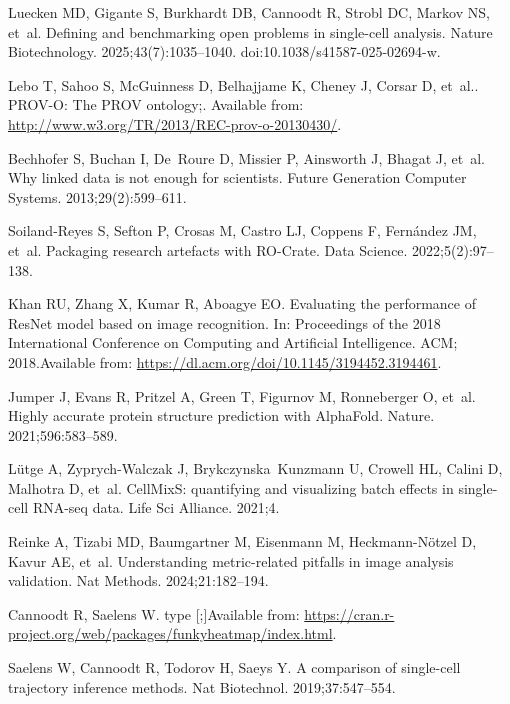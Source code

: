\documentclass[11pt]{article}
\begin{document}
\begin{thebibliography}{10}
Luecken MD, Gigante S, Burkhardt DB, Cannoodt R, Strobl DC, Markov NS, et~al.
\newblock Defining and benchmarking open problems in single-cell analysis.
\newblock Nature Biotechnology. 2025;43(7):1035--1040.
\newblock doi:{10.1038/s41587-025-02694-w}.

Lebo T, Sahoo S, McGuinness D, Belhajjame K, Cheney J, Corsar D, et~al..
  PROV-O: The PROV ontology;.
\newblock Available from: \url{http://www.w3.org/TR/2013/REC-prov-o-20130430/}.

Bechhofer S, Buchan I, De~Roure D, Missier P, Ainsworth J, Bhagat J, et~al.
\newblock Why linked data is not enough for scientists.
\newblock Future Generation Computer Systems. 2013;29(2):599--611.

Soiland-Reyes S, Sefton P, Crosas M, Castro LJ, Coppens F, Fern{\'a}ndez JM,
  et~al.
\newblock Packaging research artefacts with RO-Crate.
\newblock Data Science. 2022;5(2):97--138.

Khan RU, Zhang X, Kumar R, Aboagye EO.
\newblock Evaluating the performance of {ResNet} model based on image
  recognition.
\newblock In: Proceedings of the 2018 International Conference on Computing and
  Artificial Intelligence. ACM; 2018.Available from:
  \url{https://dl.acm.org/doi/10.1145/3194452.3194461}.

Jumper J, Evans R, Pritzel A, Green T, Figurnov M, Ronneberger O, et~al.
\newblock Highly accurate protein structure prediction with AlphaFold.
\newblock Nature. 2021;596:583--589.

Lütge A, Zyprych-Walczak J, Brykczynska~Kunzmann U, Crowell HL, Calini D,
  Malhotra D, et~al.
\newblock CellMixS: quantifying and visualizing batch effects in single-cell
  RNA-seq data.
\newblock Life Sci Alliance. 2021;4.

Reinke A, Tizabi MD, Baumgartner M, Eisenmann M, Heckmann-Nötzel D, Kavur AE,
  et~al.
\newblock Understanding metric-related pitfalls in image analysis validation.
\newblock Nat Methods. 2024;21:182--194.

Cannoodt R, Saelens W. type [;]Available from:
  \url{https://cran.r-project.org/web/packages/funkyheatmap/index.html}.

Saelens W, Cannoodt R, Todorov H, Saeys Y.
\newblock A comparison of single-cell trajectory inference methods.
\newblock Nat Biotechnol. 2019;37:547--554.


\end{thebibliography}
\end{document}
